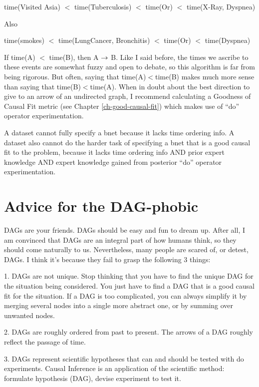 time(Visited Asia) $<$ time(Tuberculosis) $<$ time(Or) $<$ time(X-Ray,
Dyspnea)

Also

time(smokes) $<$ time(LungCancer, Bronchitis) $<$ time(Or) $<$ time(Dyspnea)

If time(A) $<$ time(B), then A $\rightarrow$ B. Like I
said before, the times we ascribe to
these events are somewhat fuzzy and open to debate, so this algorithm is far
from being rigorous. But often, saying that  time(A)$<$time(B) makes much more
sense than saying that time(B)$<$time(A). When in doubt about the best
direction to give to an arrow of an undirected graph, I recommend calculating
a Goodness of Causal Fit metric (see Chapter
\ref{ch-good-causal-fit}) which makes use of ``do” operator
experimentation.


A dataset cannot fully specify a
bnet because it lacks time ordering info. A dataset also cannot do the harder
task of specifying a bnet that is a good causal fit to the problem, because
it lacks time ordering info AND prior expert knowledge AND expert knowledge
gained from posterior ``do” operator experimentation.

\section{Advice for the DAG-phobic}

DAGs are your friends. DAGs should be easy and fun to dream up. After all, I
am convinced that DAGs are an integral part of how humans think, so they
should come naturally to us.  Nevertheless, many people are scared of, or
detest, DAGs. I think it’s because they fail to grasp the following 3 things:

1. DAGs are not unique. Stop thinking that you have to find the unique DAG
for the situation being considered. You just have to find a DAG that is a
good causal fit for the situation. If a DAG is too complicated, you can
always simplify it by merging several nodes into a single more abstract one,
or by summing over unwanted nodes.

2. DAGs are roughly ordered from past to present. The arrows of a DAG roughly
reflect the passage of time.

3. DAGs represent scientific hypotheses that can and should be tested with
do experiments. Causal Inference is an
application of the scientific method:
formulate hypothesis (DAG), devise experiment
to test it.
